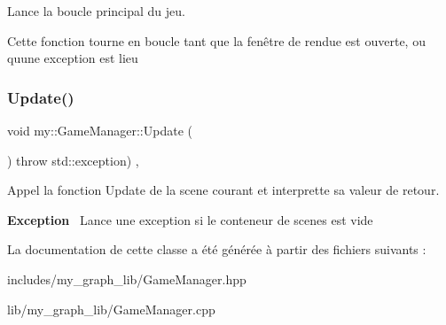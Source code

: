 Lance la boucle principal du jeu. 

Cette fonction tourne en boucle tant que la fenêtre de rendue est ouverte, ou qu\textquotesingle{}une exception est lieu \mbox{\label{classmy_1_1GameManager_afb2475a81919fd9f60bc6d4f3655e39d}} 
\subsubsection{\texorpdfstring{Update()}{Update()}}
{\footnotesize\ttfamily void my\+::\+Game\+Manager\+::\+Update (\begin{DoxyParamCaption}{ }\end{DoxyParamCaption}) throw  std\+::exception) \hspace{0.3cm}{\ttfamily [protected]}, {\ttfamily [virtual]}}



Appel la fonction Update de la scene courant et interprette sa valeur de retour. 

{\bfseries Exception}~\newline
 Lance une exception si le conteneur de scenes est vide 

La documentation de cette classe a été générée à partir des fichiers suivants \+:\begin{DoxyCompactItemize}
\item 
includes/my\+\_\+graph\+\_\+lib/Game\+Manager.\+hpp\item 
lib/my\+\_\+graph\+\_\+lib/Game\+Manager.\+cpp\end{DoxyCompactItemize}
